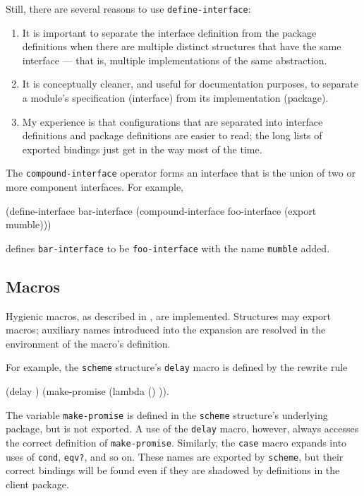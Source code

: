 Still, there are several reasons to use {\tt define-interface}:
\begin{enumerate}
\item It is important to separate the interface definition from the
package definitions when there are multiple distinct structures that
have the same interface --- that is, multiple implementations of the
same abstraction.

\item It is conceptually cleaner, and useful for documentation
purposes, to separate a module's specification (interface) from its
implementation (package).

\item My experience is that configurations that are separated into
interface definitions and package definitions are easier to read; the
long lists of exported bindings just get in the way most of the time.
\end{enumerate}

The {\tt compound-interface} operator forms an interface that is the
union of two or more component interfaces.  For example,
\begin{code}
    (define-interface bar-interface
      (compound-interface foo-interface (export mumble)))
\end{code}
defines {\tt bar-interface} to be {\tt foo-interface} with the name
{\tt mumble} added.


\subsection*{Macros}

Hygienic macros, as described in
\cite{Clinger-Rees:Macros,Clinger-Rees:R4RS}, are implemented.
Structures may export macros; auxiliary names introduced into the
expansion are resolved in the environment of the macro's definition.

For example, the {\tt scheme} structure's {\tt delay} macro 
is defined by the rewrite rule
\begin{code}
    (delay )  \xform  (make-promise (lambda () ))\rm.
\end{code}
The variable {\tt make-promise} is defined in the {\tt scheme}
structure's underlying package, but is not exported.  A use of the
{\tt delay} macro, however, always accesses the correct definition
of {\tt make-promise}.  Similarly, the {\tt case} macro expands into
uses of {\tt cond}, {\tt eqv?}, and so on.  These names are exported
by {\tt scheme}, but their correct bindings will be found even if they
are shadowed by definitions in the client package.


